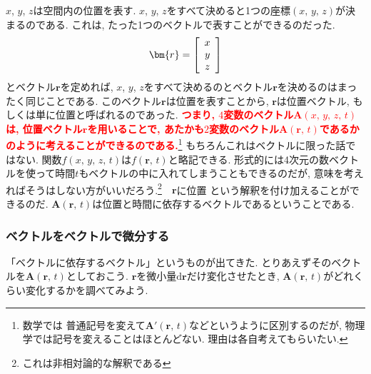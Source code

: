 $x$, $y$, $z$は空間内の位置を表す. $x$, $y$, $z$をすべて決めると1つの座標$(x, \, y, \, z)$が決まるのである. 
これは, たった1つのベクトルで表すことができるのだった. 
$$
\bm{r} = \left[
\renewcommand{\arraystretch}{1}
\begin{array}{c}
x \\
y \\
z
\end{array}
\right]
$$
とベクトル$\bm{r}$を定めれば, $x$, $y$, $z$をすべて決めるのとベクトル$\bm{r}$を決めるのはまったく同じことである. 
このベクトル$\bm{r}$は位置を表すことから, $\bm{r}$は位置ベクトル, もしくは単に位置と呼ばれるのであった. 
\textbf{\textcolor{red}{つまり, $4$変数のベクトル$\bm{A}(x, \, y, \, z, \, t)$は, 位置ベクトル$\bm{r}$を用いることで, 
あたかも$2$変数のベクトル$\bm{A}(\bm{r}, \, t)$であるかのように考えることができるのである.}}\footnote{数学では
普通記号を変えて$\bm{A}'(\bm{r}, \, t)$などというように区別するのだが, 
物理学では記号を変えることはほとんどない. 
理由は各自考えてもらいたい.} もちろんこれはベクトルに限った話ではない. 
関数$f(x, \, y, \, z, \, t)$は$f(\bm{r}, \, t)$と略記できる. 
形式的には4次元の数ベクトルを使って時間$t$もベクトルの中に入れてしまうこともできるのだが, 
意味を考えればそうはしない方がいいだろう.\footnote{これは非相対論的な解釈である}　$\bm{r}$に位置
という解釈を付け加えることができるのだ. 
$\bm{A}(\bm{r}, \, t)$は位置と時間に依存するベクトルであるということである. 

\subsubsection{ベクトルをベクトルで微分する}
「ベクトルに依存するベクトル」というものが出てきた. とりあえずそのベクトルを$\bm{A}(\bm{r}, \, t)$としておこう. 
$\bm{r}$を微小量$\mathrm{d}\bm{r}$だけ変化させたとき, $\bm{A}(\bm{r}, \, t)$がどれくらい変化するかを調べてみよう. 

